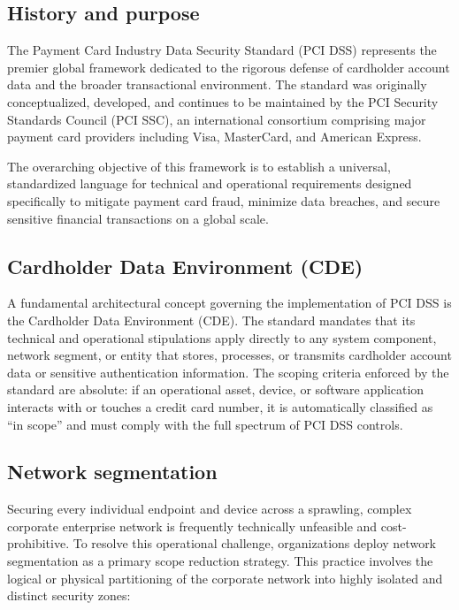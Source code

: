 \documentclass[12pt,a4paper,oneside]{report}
\begin{document}
	
	\subsection{History and purpose}
	The Payment Card Industry Data Security Standard (PCI DSS) represents the premier global framework dedicated to the rigorous defense of cardholder account data and the broader transactional environment. The standard was originally conceptualized, developed, and continues to be maintained by the PCI Security Standards Council (PCI SSC), an international consortium comprising major payment card providers including Visa, MasterCard, and American Express. 
	
	The overarching objective of this framework is to establish a universal, standardized language for technical and operational requirements designed specifically to mitigate payment card fraud, minimize data breaches, and secure sensitive financial transactions on a global scale.
	
	\subsection{Cardholder Data Environment (CDE)}
	A fundamental architectural concept governing the implementation of PCI DSS is the Cardholder Data Environment (CDE). The standard mandates that its technical and operational stipulations apply directly to any system component, network segment, or entity that stores, processes, or transmits cardholder account data or sensitive authentication information. The scoping criteria enforced by the standard are absolute: if an operational asset, device, or software application interacts with or touches a credit card number, it is automatically classified as ``in scope'' and must comply with the full spectrum of PCI DSS controls.
	
	\subsection{Network segmentation}
	Securing every individual endpoint and device across a sprawling, complex corporate enterprise network is frequently technically unfeasible and cost-prohibitive. To resolve this operational challenge, organizations deploy network segmentation as a primary scope reduction strategy. This practice involves the logical or physical partitioning of the corporate network into highly isolated and distinct security zones:
	
\end{document}
